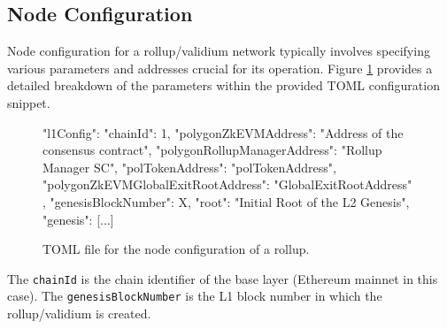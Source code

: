 \subsection{Node Configuration}

Node configuration for a rollup/validium network typically involves specifying various parameters and addresses crucial for its operation. Figure \ref{fig:node-config} provides a detailed breakdown of the parameters within the provided TOML configuration snippet.

\vspace{1em}

\begin{figure}[H]
\centering
\begin{toml}
{
    "l1Config": {
        "chainId": 1,
        "polygonZkEVMAddress": "Address of the consensus contract",
        "polygonRollupManagerAddress": "Rollup Manager SC",
        "polTokenAddress": "polTokenAddress",
        "polygonZkEVMGlobalExitRootAddress": "GlobalExitRootAddress"
    },
    "genesisBlockNumber": X,
    "root": "Initial Root of the L2 Genesis",
    "genesis": [...]
}
\end{toml}
\caption{TOML file for the node configuration of a rollup. }
\label{fig:node-config}
\end{figure}


The \texttt{chainId} is the chain identifier of the base layer (Ethereum mainnet in this case). The \texttt{genesisBlockNumber} is the L1 block number in which the rollup/validium is created.







%
%
%
%








